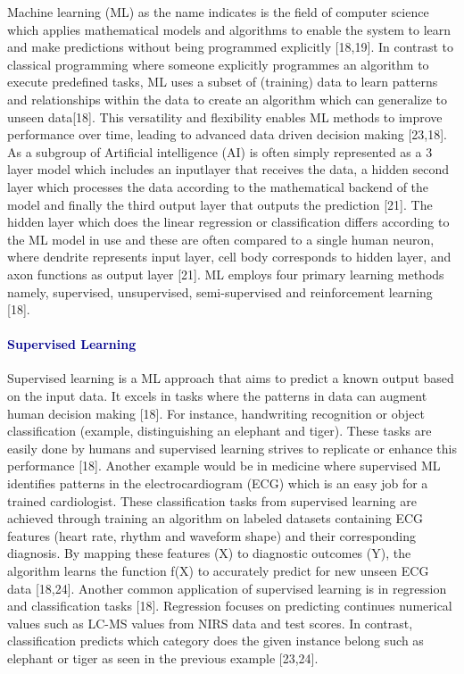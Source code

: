 \documentclass[12pt,a4paper]{article}
\begin{document}
Machine learning (ML) as the name indicates is the field of computer science which applies mathematical models and algorithms to enable the system to learn and make predictions without being programmed explicitly [18,19]. In contrast to classical programming where someone explicitly programmes an algorithm to execute predefined tasks,
ML uses a subset of (training) data to learn patterns and relationships within the data to create an algorithm which can generalize to unseen data[18]. This versatility and flexibility enables ML methods to improve performance over time, leading to advanced data driven decision making [23,18]. As a subgroup of Artificial intelligence (AI)
is often simply represented as a 3 layer model which includes an inputlayer that receives the data, a hidden second layer which processes the data according to the mathematical backend of the model and finally the third output layer that outputs the prediction [21]. The hidden layer which does the linear regression or classification differs 
according to the ML model in use and these are often compared to a single human neuron, where dendrite represents input layer, cell body corresponds to hidden layer, and axon functions as output layer [21]. ML employs four primary learning methods namely, supervised, unsupervised, semi-supervised and reinforcement learning [18]. \\

\paragraph{\textcolor{darkblue}{Supervised Learning}} 
Supervised learning is a ML approach that aims to predict a known output  based on the input data. It excels in tasks where the patterns in data can augment human decision making [18]. 
For instance, handwriting recognition or object classification (example, distinguishing an elephant and tiger). These tasks are easily done by humans and supervised learning strives to replicate 
or enhance this performance [18]. Another example would be in medicine where supervised ML identifies patterns in the electrocardiogram (ECG) which is an easy job for a trained cardiologist. 
These classification tasks from supervised learning are achieved through training an algorithm on labeled datasets containing ECG features (heart rate, rhythm and waveform shape) and their corresponding diagnosis. 
By mapping these features (X) to diagnostic outcomes (Y), the algorithm learns the function f(X) to accurately predict for new unseen ECG data [18,24]. Another common application of supervised learning is in regression and classification tasks [18]. 
Regression focuses on predicting continues numerical values such as LC-MS values from NIRS data and test scores. In contrast, classification predicts which category does the given instance belong such as elephant or tiger as seen in the previous example [23,24]. \\
\end{document}
